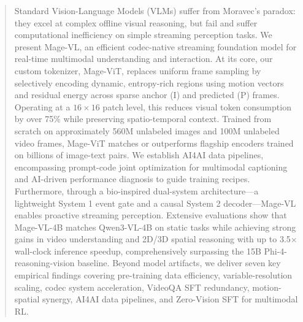\begin{abstract}
Standard Vision-Language Models (VLMs) suffer from Moravec's paradox: they excel at complex offline visual reasoning, but fail and suffer computational inefficiency on simple streaming perception tasks. We present Mage-VL, an efficient codec-native streaming foundation model for real-time multimodal understanding and interaction. At its core, our custom tokenizer, Mage-ViT, replaces uniform frame sampling by selectively encoding dynamic, entropy-rich regions using motion vectors and residual energy across sparse anchor (I) and predicted (P) frames. Operating at a $16\times16$ patch level, this reduces visual token consumption by over 75\% while preserving spatio-temporal context. Trained from scratch on approximately 560M unlabeled images and 100M unlabeled video frames, Mage-ViT matches or outperforms flagship encoders trained on billions of image-text pairs. We establish AI4AI data pipelines, encompassing prompt-code joint optimization for multimodal captioning and AI-driven performance diagnosis to guide training recipes. Furthermore, through a bio-inspired dual-system architecture—a lightweight System 1 event gate and a causal System 2 decoder—Mage-VL enables proactive streaming perception. Extensive evaluations show that Mage-VL-4B matches Qwen3-VL-4B on static tasks while achieving strong gains in video understanding and 2D/3D spatial reasoning with up to 3.5$\times$ wall-clock inference speedup, comprehensively surpassing the 15B Phi-4-reasoning-vision baseline. Beyond model artifacts, we deliver seven key empirical findings covering pre-training data efficiency, variable-resolution scaling, codec system acceleration, VideoQA SFT redundancy, motion-spatial synergy, AI4AI data pipelines, and Zero-Vision SFT for multimodal RL.
\end{abstract}
